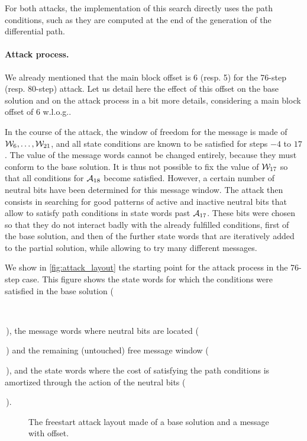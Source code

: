 For both attacks, the implementation of this search directly uses the path conditions, such as they are computed at the end of the generation of the differential path.

\paragraph{Attack process.}
We already mentioned that the main block offset is 6 (resp. 5) for the 76-step (resp. 80-step) attack. Let us detail here the effect of this offset on the base solution and on the attack process
in a bit more details, considering a main block offset of 6 w.l.o.g..

In the course of the attack, the window of freedom for the message is made of $\mathcal{W}_6,\ldots,\mathcal{W}_{21}$, and all state conditions are known to be satisfied for steps $-4$ to $17$.
The value of the message words cannot be changed entirely, because they must conform to the base solution. It is thus not possible to \eg fix the value of $\mathcal{W}_{17}$ so that all conditions
for $\mathcal{A}_{18}$ become satisfied. However, a certain number of neutral bits have been determined for this message window. The attack then consists in searching for good patterns of active and
inactive neutral bits that allow to satisfy path conditions in state words past $\mathcal{A}_{17}$. These bits were chosen so that they do not interact badly with the already fulfilled conditions,
first of the base solution, and then of the further state words that are iteratively added to the partial solution, while allowing to try many different messages.

We show in \autoref{fig:attack_layout} the starting point for the attack process in the 76-step case. This figure shows the state words for which the conditions were satisfied in the base solution
(\,\,\,\,),
the message words where neutral bits are located (\,\,) and the remaining (untouched) free message
window (\,\,),
and the state words where the cost of satisfying the path conditions is amortized through the action of the neutral bits (\,\,).

\begin{figure}[htb]
  \begin{center}
  
  \end{center}
  \caption{The freestart attack layout made of a base solution and a message with offset.}
  \label{fig:attack_layout}
\end{figure}
